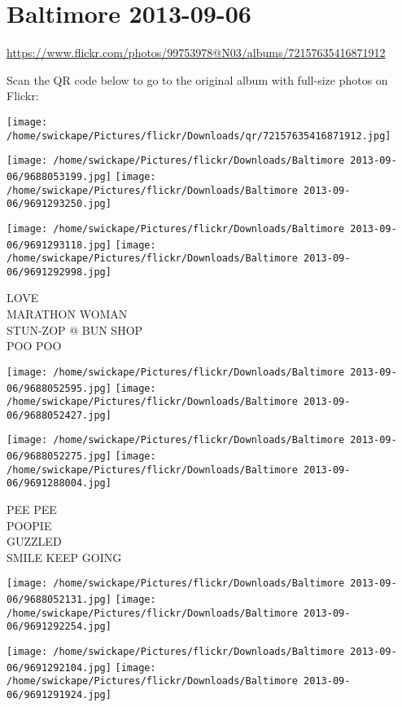 \documentclass[10pt,letterpaper]{article}
\title{}
\author{}
\date{}
\begin{document}
\section*{Baltimore 2013-09-06}

\url{https://www.flickr.com/photos/99753978@N03/albums/72157635416871912}

Scan the QR code below to go to the original album with full-size photos on Flickr:

\texttt{[image: /home/swickape/Pictures/flickr/Downloads/qr/72157635416871912.jpg]}
\pagebreak

\texttt{[image: /home/swickape/Pictures/flickr/Downloads/Baltimore 2013-09-06/9688053199.jpg]}
\texttt{[image: /home/swickape/Pictures/flickr/Downloads/Baltimore 2013-09-06/9691293250.jpg]}

\texttt{[image: /home/swickape/Pictures/flickr/Downloads/Baltimore 2013-09-06/9691293118.jpg]}
\texttt{[image: /home/swickape/Pictures/flickr/Downloads/Baltimore 2013-09-06/9691292998.jpg]}

LOVE\\
MARATHON WOMAN\\
STUN{-}ZOP @ BUN SHOP\\
POO POO
\pagebreak

\texttt{[image: /home/swickape/Pictures/flickr/Downloads/Baltimore 2013-09-06/9688052595.jpg]}
\texttt{[image: /home/swickape/Pictures/flickr/Downloads/Baltimore 2013-09-06/9688052427.jpg]}

\texttt{[image: /home/swickape/Pictures/flickr/Downloads/Baltimore 2013-09-06/9688052275.jpg]}
\texttt{[image: /home/swickape/Pictures/flickr/Downloads/Baltimore 2013-09-06/9691288004.jpg]}

PEE PEE\\
POOPIE\\
GUZZLED\\
SMILE KEEP GOING
\pagebreak

\texttt{[image: /home/swickape/Pictures/flickr/Downloads/Baltimore 2013-09-06/9688052131.jpg]}
\texttt{[image: /home/swickape/Pictures/flickr/Downloads/Baltimore 2013-09-06/9691292254.jpg]}

\texttt{[image: /home/swickape/Pictures/flickr/Downloads/Baltimore 2013-09-06/9691292104.jpg]}
\texttt{[image: /home/swickape/Pictures/flickr/Downloads/Baltimore 2013-09-06/9691291924.jpg]}
\end{document}
